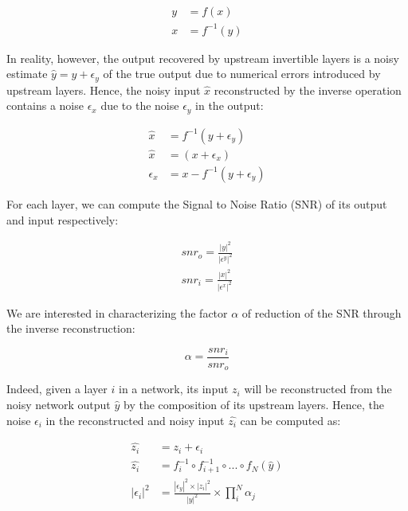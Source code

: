 \documentclass[twocolumn]{bmcart}
\begin{document}
 \begin{subequations}
   \begin{align}
   y &= f(x) \\
   x &= f^{-1}(y)
   \end{align}
 \end{subequations}

In reality, however, the output recovered by upstream invertible layers is a noisy estimate $\hat{y}=y+\epsilon_y$
of the true output due to numerical errors introduced by upstream layers.
Hence, the noisy input $\hat{x}$ reconstructed by the inverse operation contains a noise $\epsilon_x$ due to the noise $\epsilon_y$ in the output:

 \begin{subequations}
   \begin{align}
   \hat{x} &= f^{-1}(y+\epsilon_y) \\
   \hat{x} &= (x+\epsilon_x) \\
   \epsilon_x &= x - f^{-1}(y+\epsilon_y)
   \end{align}
 \end{subequations}

For each layer, we can compute the Signal to Noise Ratio (SNR) of its output and input respectively:

\begin{subequations}
\begin{align}
snr_o = \frac{|y|^2}{|\epsilon^y|^2} \\
snr_i = \frac{|x|^2}{|\epsilon^x|^2}
\end{align}
\end{subequations}

We are interested in characterizing the factor $\alpha$ of reduction of the SNR through the inverse reconstruction:

\begin{equation}
\alpha = \frac{snr_i}{snr_o}
\end{equation}

Indeed, given a layer $i$ in a network, its input $z_i$ will be reconstructed
from the noisy network output $\hat{y}$ by the composition of its upstream layers.
Hence, the noise $\epsilon_i$ in the reconstructed and noisy input $\hat{z_i}$ can be computed as:

\begin{subequations}
\begin{align}
\hat{z_i}  &= z_i + \epsilon_i \\
\hat{z_i}  &=  f_i^{-1} \circ f_{i+1}^{-1} \circ ... \circ f_N(\hat{y})\\
| \epsilon_i |^2 &=  \frac{| \epsilon_y |^2 \times | z_i |^2}{| y |^2} \times \prod_i^{N} \alpha_j \\
\end{align}
\end{subequations}
\end{document}
